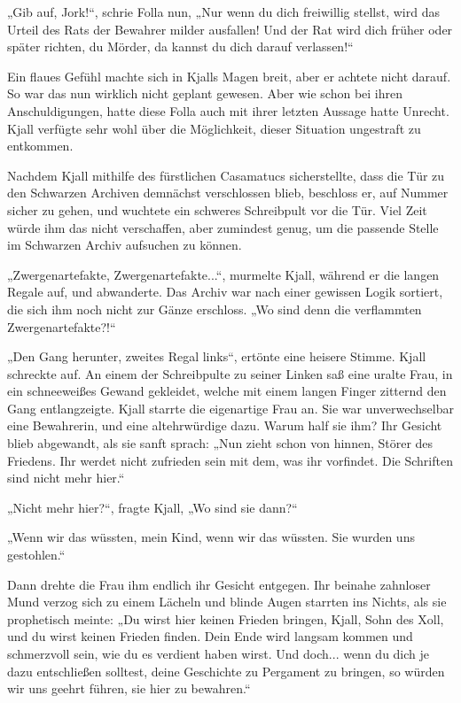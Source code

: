 „Gib auf, Jork!“, schrie Folla nun, „Nur wenn du dich freiwillig stellst, wird das Urteil des Rats der Bewahrer milder ausfallen! Und der Rat wird dich früher oder später richten, du Mörder, da kannst du dich darauf verlassen!“

Ein flaues Gefühl machte sich in Kjalls Magen breit, aber er achtete nicht darauf. So war das nun wirklich nicht geplant gewesen. Aber wie schon bei ihren Anschuldigungen, hatte diese Folla auch mit ihrer letzten Aussage hatte Unrecht. Kjall verfügte sehr wohl über die Möglichkeit, dieser Situation ungestraft zu entkommen.

Nachdem Kjall mithilfe des fürstlichen Casamatucs sicherstellte, dass die Tür zu den Schwarzen Archiven demnächst verschlossen blieb, beschloss er, auf Nummer sicher zu gehen, und wuchtete ein schweres Schreibpult vor die Tür. Viel Zeit würde ihm das nicht verschaffen, aber zumindest genug, um die passende Stelle im Schwarzen Archiv aufsuchen zu können.

„Zwergenartefakte, Zwergenartefakte...“, murmelte Kjall, während er die langen Regale auf, und abwanderte. Das Archiv war nach einer gewissen Logik sortiert, die sich ihm noch nicht zur Gänze erschloss. „Wo sind denn die verflammten Zwergenartefakte?!“

„Den Gang herunter, zweites Regal links“, ertönte eine heisere Stimme. Kjall schreckte auf. An einem der Schreibpulte zu seiner Linken saß eine uralte Frau, in ein schneeweißes Gewand gekleidet, welche mit einem langen Finger zitternd den Gang entlangzeigte. Kjall starrte die eigenartige Frau an. Sie war unverwechselbar eine Bewahrerin, und eine altehrwürdige dazu. Warum half sie ihm? Ihr Gesicht blieb abgewandt, als sie sanft sprach: „Nun zieht schon von hinnen, Störer des Friedens. Ihr werdet nicht zufrieden sein mit dem, was ihr vorfindet. Die Schriften sind nicht mehr hier.“

„Nicht mehr hier?“, fragte Kjall, „Wo sind sie dann?“

„Wenn wir das wüssten, mein Kind, wenn wir das wüssten. Sie wurden uns gestohlen.“

Dann drehte die Frau ihm endlich ihr Gesicht entgegen. Ihr beinahe zahnloser Mund verzog sich zu einem Lächeln und blinde Augen starrten ins Nichts, als sie prophetisch meinte: „Du wirst hier keinen Frieden bringen, Kjall, Sohn des Xoll, und du wirst keinen Frieden finden. Dein Ende wird langsam kommen und schmerzvoll sein, wie du es verdient haben wirst. Und doch... wenn du dich je dazu entschließen solltest, deine Geschichte zu Pergament zu bringen, so würden wir uns geehrt führen, sie hier zu bewahren.“

